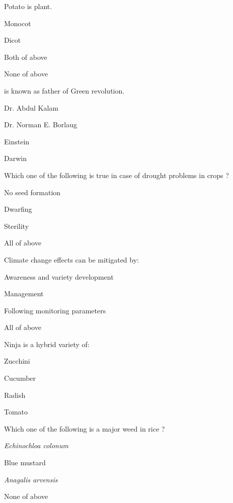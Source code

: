 \begin{questions}
\question Potato is \fillin[][3cm] plant.
  \begin{items}
  \item Monocot
  \item Dicot
  \item Both of above
  \item None of above
  \end{items}

\question \fillin[][4cm] is known as father of Green revolution.
  \begin{items}
  \item Dr. Abdul Kalam
  \item Dr. Norman E. Borlaug
  \item Einstein
  \item Darwin
  \end{items}

\question Which one of the following is true in case of drought problems in crops ?
  \begin{items}
  \item No seed formation
  \item Dwarfing
  \item Sterility
  \item All of above
  \end{items}

\question Climate change effects can be mitigated by:
  \begin{items}
  \item Awareness and variety development
  \item Management
  \item Following monitoring parameters
  \item All of above
  \end{items}

\question Ninja is a hybrid variety of:
  \begin{items}
  \item Zucchini
  \item Cucumber
  \item Radish
  \item Tomato
  \end{items}

\question Which one of the following is a major weed in rice ?
  \begin{items}
  \item \textit{Echinochloa colonum}
  \item Blue mustard
  \item \textit{Anagalis arvensis}
  \item None of above
  \end{items}

\end{questions}
